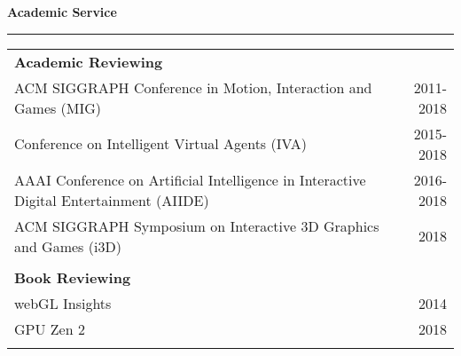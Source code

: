 \needspace{6em}
{\large {\bf Academic Service}}
\vspace{0.1cm}
\hrule
\begin{tabular*}{7.1in}{@{}l@{\extracolsep\fill}r}

{\bf Academic Reviewing } & \\
  ACM SIGGRAPH Conference in Motion, Interaction and Games (MIG) & 2011-2018 \\
Conference on Intelligent Virtual Agents (IVA) & 2015-2018\\
  AAAI Conference on Artificial Intelligence in Interactive Digital Entertainment (AIIDE) & 2016-2018 \\
ACM SIGGRAPH Symposium on Interactive 3D Graphics and Games (i3D) & 2018 \\
\phantom{yommomma} & \phantom{2002}\\

{\bf Book Reviewing } & \\
webGL Insights & 2014 \\
GPU Zen 2 & 2018 \\
\phantom{yommomma} & \phantom{2002}\\
\end{tabular*}


